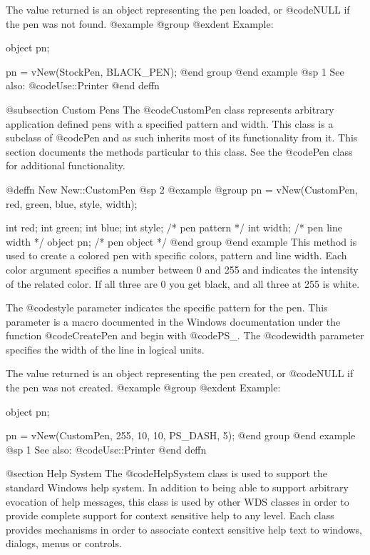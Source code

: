 The value returned is an object representing the pen loaded, or
@code{NULL} if the pen was not found.
@example
@group
@exdent Example:

object  pn;

pn = vNew(StockPen, BLACK_PEN);
@end group
@end example
@sp 1
See also:  @code{Use::Printer}
@end deffn







@subsection Custom Pens
The @code{CustomPen} class represents arbitrary application defined pens
with a specified pattern and width.  This class is a subclass of
@code{Pen} and as such inherits most of its functionality from it.  This
section documents the methods particular to this class.  See the
@code{Pen} class for additional functionality.






@deffn {New} New::CustomPen
@sp 2
@example
@group
pn = vNew(CustomPen, red, green, blue, style, width);

int     red;
int     green;
int     blue;
int     style;  /*  pen pattern     */
int     width;  /*  pen line width  */
object  pn;     /*  pen object      */
@end group
@end example
This method is used to create a colored pen with specific colors,
pattern and line width.  Each color argument specifies a number between
0 and 255 and indicates the intensity of the related color.  If all
three are 0 you get black, and all three at 255 is white.

The @code{style} parameter indicates the specific pattern for the pen.
This parameter is a macro documented in the Windows documentation under
the function @code{CreatePen} and begin with @code{PS_}.
The @code{width} parameter specifies the width of the line in logical
units.

The value returned is an object representing the pen created, or
@code{NULL} if the pen was not created.
@example
@group
@exdent Example:

object  pn;

pn = vNew(CustomPen, 255, 10, 10, PS_DASH, 5);
@end group
@end example
@sp 1
See also:  @code{Use::Printer}
@end deffn




@section Help System
The @code{HelpSystem} class is used to support the standard Windows
help system.  In addition to being able to support arbitrary evocation
of help messages, this class is used by other WDS classes in order to
provide complete support for context sensitive help to any level.
Each class provides mechanisms in order to associate context sensitive
help text to windows, dialogs, menus or controls.


